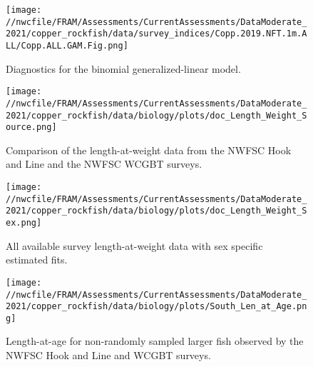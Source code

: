\documentclass[11pt,
  english,
  a4paper,
]{article}
\begin{document}
\tagmcend\tagstructend


\begin{figure}
\centering
\texttt{[image: //nwcfile/FRAM/Assessments/CurrentAssessments/DataModerate\_2021/copper\_rockfish/data/survey\_indices/Copp.2019.NFT.1m.ALL/Copp.ALL.GAM.Fig.png]}
\caption{Diagnostics for the binomial generalized-linear model.\label{fig:hkl-diag}}
\end{figure}

\tagmcend\tagstructend


\begin{figure}
\centering
\texttt{[image: //nwcfile/FRAM/Assessments/CurrentAssessments/DataModerate\_2021/copper\_rockfish/data/biology/plots/doc\_Length\_Weight\_Source.png]}
\caption{Comparison of the length-at-weight data from the NWFSC Hook and Line and the NWFSC WCGBT surveys.\label{fig:len-weight-survey}}
\end{figure}

\tagmcend\tagstructend


\begin{figure}
\centering
\texttt{[image: //nwcfile/FRAM/Assessments/CurrentAssessments/DataModerate\_2021/copper\_rockfish/data/biology/plots/doc\_Length\_Weight\_Sex.png]}
\caption{All available survey length-at-weight data with sex specific estimated fits.\label{fig:len-weight}}
\end{figure}

\tagmcend\tagstructend


\begin{figure}
\centering
\texttt{[image: //nwcfile/FRAM/Assessments/CurrentAssessments/DataModerate\_2021/copper\_rockfish/data/biology/plots/South\_Len\_at\_Age.png]}
\caption{Length-at-age for non-randomly sampled larger fish observed by the NWFSC Hook and Line and WCGBT surveys.\label{fig:survey-len-at-age-data}}
\end{figure}
\end{document}
